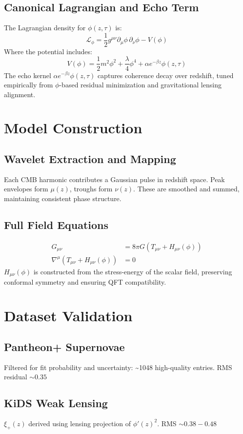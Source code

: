 \documentclass[12pt]{article}
\begin{document}
	\subsection{Canonical Lagrangian and Echo Term}
	The Lagrangian density for \( \phi(z, \tau) \) is:
	\[ \mathcal{L}_{\phi} = \frac{1}{2} g^{\mu\nu} \partial_\mu \phi \, \partial_\nu \phi - V(\phi) \]
	Where the potential includes:
	\[ V(\phi) = \frac{1}{2} m^2 \phi^2 + \frac{\lambda}{4} \phi^4 + \alpha e^{-\beta z} \phi(z, \tau) \]
	The echo kernel \( \alpha e^{-\beta z} \phi(z, \tau) \) captures coherence decay over redshift, tuned empirically from $\phi$-based residual minimization and gravitational lensing alignment.
	
	\section{Model Construction}
	\subsection{Wavelet Extraction and Mapping}
	Each CMB harmonic contributes a Gaussian pulse in redshift space. Peak envelopes form \( \mu(z) \), troughs form \( \nu(z) \). These are smoothed and summed, maintaining consistent phase structure.
	
	\subsection{Full Field Equations}
	\begin{align*}
		G_{\mu\nu} &= 8\pi G \left(T_{\mu\nu} + H_{\mu\nu}(\phi) \right) \\
		\nabla^{\mu} \left(T_{\mu\nu} + H_{\mu\nu}(\phi)\right) &= 0
	\end{align*}
	\( H_{\mu\nu}(\phi) \) is constructed from the stress-energy of the scalar field, preserving conformal symmetry and ensuring QFT compatibility.
	
	\section{Dataset Validation}
	\subsection{Pantheon+ Supernovae}
	Filtered for fit probability and uncertainty: \textasciitilde1048 high-quality entries. RMS residual \( \sim 0.35 \)
	\subsection{KiDS Weak Lensing}
	\( \xi_+(z) \) derived using lensing projection of \( \phi'(z)^2 \). RMS \( \sim 0.38{-}0.48 \)
\end{document}
